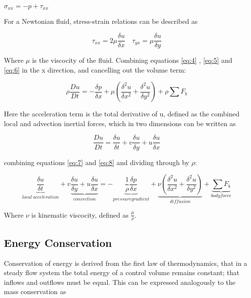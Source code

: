     \centerline{$\sigma_{xx} = -p + \tau_{xx}$}

    For a Newtonian fluid, stress-strain relations can be described as 

    \begin{equation} \label{eq:6}
      \tau_{xx} = 2 \mu \frac{\delta u}{\delta x} \quad \tau_{yx} = \mu \frac{\delta u}{\delta y}
    \end{equation}

    Where $\mu$ is the viscocity of the fluid. Combining equations \ref{eq:4} , \ref{eq:5} and \ref{eq:6} in the x direction, and cancelling out the volume term:

    \begin{equation} \label{eq:7}
      \rho \frac{Du}{Dt} = - \frac{\delta p}{\delta x} + \mu (\frac{\delta^2 u}{\delta x^2} + \frac{\delta^2 u}{\delta y^2}) + \rho \sum F_{b}
    \end{equation}
    
    Here the acceleration term is the total derivative of u, defined as the combined local and advection inertial forces, which in two dimensions can be written as

    \begin{equation} \label{eq:8}
      \frac{Du}{Dt} = \frac{\delta u}{\delta t} + v \frac{\delta u}{\delta y} + u \frac{\delta u}{\delta x}
    \end{equation}

    combining equations \ref{eq:7} and \ref{eq:8} and dividing through by $\rho$:

    \begin{equation} \label{eq:9}
      \underbrace{\frac{\delta u}{\delta t}}_{local\ acceleration} + v \underbrace{\frac{\delta u}{\delta y} + u \frac{\delta u}{\delta x}}_{convection} = - \underbrace{\frac{1}{\rho} \frac{\delta p}{\delta x}}_{pressure gradient} + \underbrace{\nu (\frac{\delta^2 u}{\delta x^2} + \frac{\delta^2 u}{\delta y^2})}_{diffusion} + \underbrace{\sum F_{b}}_{body force}
    \end{equation}

    Where $\nu$ is kinematic viscocity, defined as $\frac{\mu}{\rho}$. 

    \subsection{Energy Conservation}

    Conservation of energy is derived from the first law of thermodynamics, that in a steady flow system the total energy of a control volume remains constant; that inflows and outflows must be equal. This can be expressed analogously to the mass conservation as 

